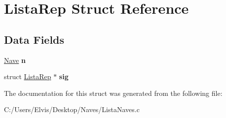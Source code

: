 \hypertarget{struct_lista_rep}{}\section{Lista\+Rep Struct Reference}
\label{struct_lista_rep}
\subsection*{Data Fields}
\begin{DoxyCompactItemize}
\item 
\hyperlink{struct_nave_rep}{Nave} {\bfseries n}\hypertarget{struct_lista_rep_a956eeed7b5214a36bbd11701a06357c8}{}\label{struct_lista_rep_a956eeed7b5214a36bbd11701a06357c8}

\item 
struct \hyperlink{struct_lista_rep}{Lista\+Rep} $\ast$ {\bfseries sig}\hypertarget{struct_lista_rep_acffc58955b57e559cf9d04057c6bbade}{}\label{struct_lista_rep_acffc58955b57e559cf9d04057c6bbade}

\end{DoxyCompactItemize}


The documentation for this struct was generated from the following file\+:\begin{DoxyCompactItemize}
\item 
C\+:/\+Users/\+Elvis/\+Desktop/\+Naves/Lista\+Naves.\+c\end{DoxyCompactItemize}
